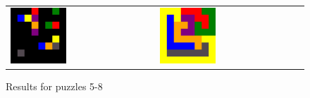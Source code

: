\documentclass{article}
\begin{document}
\begin{figure}
\begin{tabularx}{\textwidth}{X X}
		\includegraphics[width=0.4\textwidth]{8x8_input.png} &
		\includegraphics[width=0.4\textwidth]{8x8_output.png} \\
	\end{tabularx}
	\caption{Results for puzzles 5-8}
	\label{fig:resultsA}
\end{figure}
\end{document}
